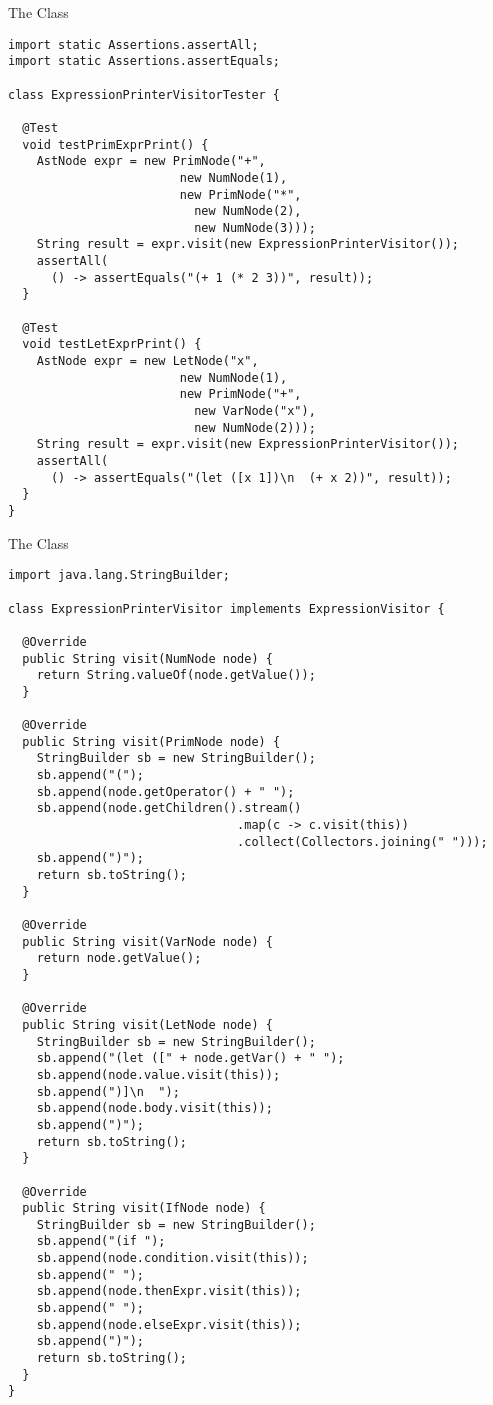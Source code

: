 \begin{cl}[]{The  Class}
\begin{lstlisting}[language=MyJava]
import static Assertions.assertAll;
import static Assertions.assertEquals;

class ExpressionPrinterVisitorTester {

  @Test
  void testPrimExprPrint() {
    AstNode expr = new PrimNode("+", 
                        new NumNode(1), 
                        new PrimNode("*", 
                          new NumNode(2), 
                          new NumNode(3)));
    String result = expr.visit(new ExpressionPrinterVisitor());
    assertAll(
      () -> assertEquals("(+ 1 (* 2 3))", result));
  }

  @Test
  void testLetExprPrint() {
    AstNode expr = new LetNode("x", 
                        new NumNode(1), 
                        new PrimNode("+", 
                          new VarNode("x"), 
                          new NumNode(2)));
    String result = expr.visit(new ExpressionPrinterVisitor());
    assertAll(
      () -> assertEquals("(let ([x 1])\n  (+ x 2))", result));
  }
}
\end{lstlisting}
\end{cl}

\begin{cl}[]{The  Class}
\begin{lstlisting}[language=MyJava]
import java.lang.StringBuilder; 

class ExpressionPrinterVisitor implements ExpressionVisitor {

  @Override
  public String visit(NumNode node) {
    return String.valueOf(node.getValue());
  }
  
  @Override
  public String visit(PrimNode node) {
    StringBuilder sb = new StringBuilder();
    sb.append("(");
    sb.append(node.getOperator() + " ");
    sb.append(node.getChildren().stream()
                                .map(c -> c.visit(this))
                                .collect(Collectors.joining(" ")));
    sb.append(")");
    return sb.toString();
  }
  
  @Override
  public String visit(VarNode node) {
    return node.getValue();
  }
  
  @Override
  public String visit(LetNode node) {
    StringBuilder sb = new StringBuilder();
    sb.append("(let ([" + node.getVar() + " ");
    sb.append(node.value.visit(this));
    sb.append(")]\n  ");
    sb.append(node.body.visit(this));
    sb.append(")");
    return sb.toString();
  }
  
  @Override
  public String visit(IfNode node) {
    StringBuilder sb = new StringBuilder();
    sb.append("(if ");
    sb.append(node.condition.visit(this));
    sb.append(" ");
    sb.append(node.thenExpr.visit(this));
    sb.append(" ");
    sb.append(node.elseExpr.visit(this));
    sb.append(")");
    return sb.toString();
  }
}
\end{lstlisting}
\end{cl}

